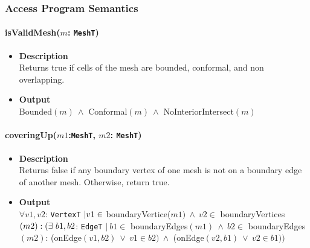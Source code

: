 \documentclass[12pt,titlepage]{article}
\begin{document}
\subsubsection{Access Program Semantics}

\paragraph{isValidMesh($m$: {\tt MeshT})}
\begin{itemize}
\item \textbf{Description}\\
Returns true if cells of the mesh are bounded, conformal, and non overlapping. 
\item \textbf{Output}\\ Bounded$(m)\ \wedge$ Conformal$(m)\ \wedge$ NoInteriorIntersect$(m)$ 
\end{itemize}

\paragraph{coveringUp($m1$:{\tt MeshT}, $m2$: {\tt MeshT})}
\begin{itemize}
\item \textbf{Description} \\
Returns false if any boundary vertex of one mesh is not on a boundary edge of another mesh.
Otherwise, return true.  
\item \textbf{Output} \\
$\forall v1, v2$: {\tt VertexT} $| \\
 v1\in$ boundaryVertice($m1)\ \wedge\ v2\in$ boundaryVertices$(m2): \\
 (\exists\ b1, b2$: {\tt EdgeT} $|\ b1 \in$ boundaryEdges$(m1)\ \wedge\ b2 \in$ boundaryEdges$(m2)$:
 (onEdge$(v1,b2)\ \vee\ v1\in b2)\ \wedge$ (onEdge$(v2, b1)\ \vee\ v2\in b1))$
\end{itemize}
\end{document}
